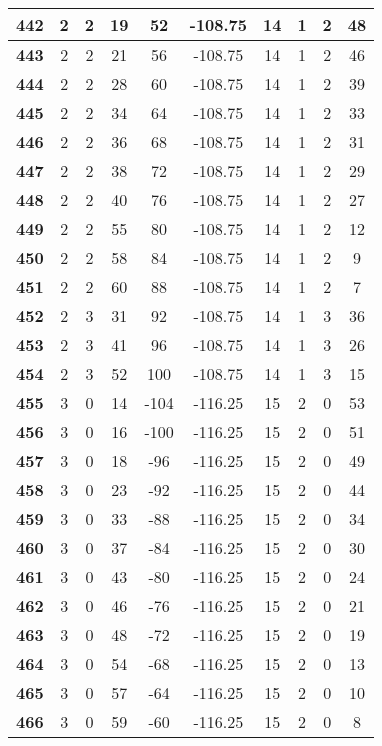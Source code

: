 \documentclass[12pt,letterpaper, onecolumn]{exam}
\begin{document}
\begin{longtable}{cccccccccc}
    \textbf{442} & 2 & 2 & 19 & 52 & -108.75 & 14 & 1 & 2 & 48 \\      \hline
    \textbf{443} & 2 & 2 & 21 & 56 & -108.75 & 14 & 1 & 2 & 46 \\ 
    \textbf{444} & 2 & 2 & 28 & 60 & -108.75 & 14 & 1 & 2 & 39 \\ 
    \textbf{445} & 2 & 2 & 34 & 64 & -108.75 & 14 & 1 & 2 & 33 \\ 
    \textbf{446} & 2 & 2 & 36 & 68 & -108.75 & 14 & 1 & 2 & 31 \\ 
    \textbf{447} & 2 & 2 & 38 & 72 & -108.75 & 14 & 1 & 2 & 29 \\ 
    \textbf{448} & 2 & 2 & 40 & 76 & -108.75 & 14 & 1 & 2 & 27 \\ 
    \textbf{449} & 2 & 2 & 55 & 80 & -108.75 & 14 & 1 & 2 & 12 \\ 
    \textbf{450} & 2 & 2 & 58 & 84 & -108.75 & 14 & 1 & 2 & 9 \\ 
    \textbf{451} & 2 & 2 & 60 & 88 & -108.75 & 14 & 1 & 2 & 7 \\ 
    \textbf{452} & 2 & 3 & 31 & 92 & -108.75 & 14 & 1 & 3 & 36 \\ 
    \textbf{453} & 2 & 3 & 41 & 96 & -108.75 & 14 & 1 & 3 & 26 \\ 
    \textbf{454} & 2 & 3 & 52 & 100 & -108.75 & 14 & 1 & 3 & 15 \\ 
    \textbf{455} & 3 & 0 & 14 & -104 & -116.25 & 15 & 2 & 0 & 53 \\ 
    \textbf{456} & 3 & 0 & 16 & -100 & -116.25 & 15 & 2 & 0 & 51 \\ 
    \textbf{457} & 3 & 0 & 18 & -96 & -116.25 & 15 & 2 & 0 & 49 \\ 
    \textbf{458} & 3 & 0 & 23 & -92 & -116.25 & 15 & 2 & 0 & 44 \\ 
    \textbf{459} & 3 & 0 & 33 & -88 & -116.25 & 15 & 2 & 0 & 34 \\ 
    \textbf{460} & 3 & 0 & 37 & -84 & -116.25 & 15 & 2 & 0 & 30 \\ 
    \textbf{461} & 3 & 0 & 43 & -80 & -116.25 & 15 & 2 & 0 & 24 \\ 
    \textbf{462} & 3 & 0 & 46 & -76 & -116.25 & 15 & 2 & 0 & 21 \\ 
    \textbf{463} & 3 & 0 & 48 & -72 & -116.25 & 15 & 2 & 0 & 19 \\ 
    \textbf{464} & 3 & 0 & 54 & -68 & -116.25 & 15 & 2 & 0 & 13 \\ 
    \textbf{465} & 3 & 0 & 57 & -64 & -116.25 & 15 & 2 & 0 & 10 \\ 
    \textbf{466} & 3 & 0 & 59 & -60 & -116.25 & 15 & 2 & 0 & 8 \\ 

\end{longtable}
\end{document}
